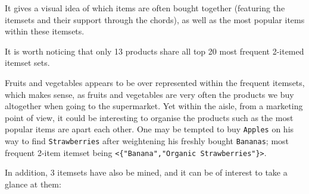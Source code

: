\documentclass[11pt]{article}
\begin{document}
It gives a visual idea of which items are often bought together
(featuring the itemsets and their support through the chords), as well
as the most popular items within these itemsets.

It is worth noticing that only 13 products share all top 20 most
frequent 2-itemed itemset sets.

Fruits and vegetables appears to be over represented within the frequent
itemsets, which makes sense, as fruits and vegetables are very often the
products we buy altogether when going to the supermarket. Yet within the
aisle, from a marketing point of view, it could be interesting to
organise the products such as the most popular items are apart each
other. One may be tempted to buy \texttt{Apples} on his way to find
\texttt{Strawberries} after weightening his freshly bought
\texttt{Bananas}; most frequent 2-item itemset being
\texttt{\textless{}\{"Banana","Organic\ Strawberries"\}\textgreater{}}.

In addition, 3 itemsets have also be mined, and it can be of interest to
take a glance at them:
\end{document}
